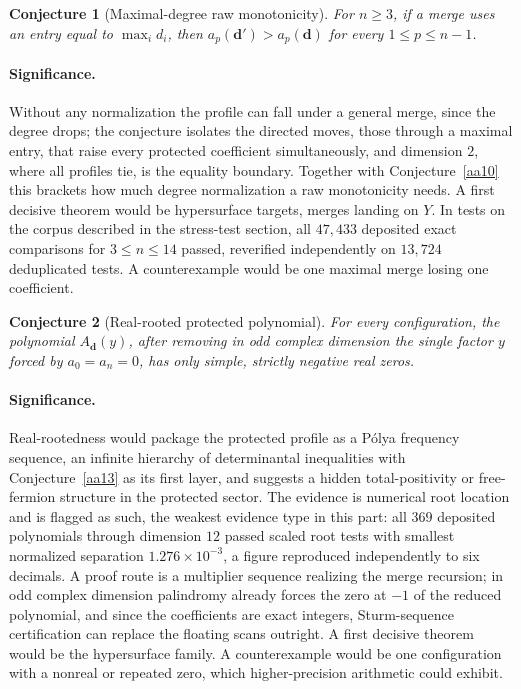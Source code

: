 \documentclass[11pt]{article}
\newtheorem{conjecture}{Conjecture}
\theoremstyle{definition}
\begin{document}
\begin{conjecture}[Maximal-degree raw monotonicity]\label{aa11}
For $n\ge3$, if a merge uses an entry equal to $\max_id_i$, then $a_p(\mathbf d')>a_p(\mathbf d)$ for every $1\le p\le n-1$.
\end{conjecture}

\paragraph{Significance.}
Without any normalization the profile can fall under a general merge, since the degree drops; the conjecture isolates the directed moves, those through a maximal entry, that raise every protected coefficient simultaneously, and dimension $2$, where all profiles tie, is the equality boundary.  Together with Conjecture~\ref{aa10} this brackets how much degree normalization a raw monotonicity needs.  A first decisive theorem would be hypersurface targets, merges landing on $Y$.  In tests on the corpus described in the stress-test section, all $47{,}433$ deposited exact comparisons for $3\le n\le14$ passed, reverified independently on $13{,}724$ deduplicated tests.  A counterexample would be one maximal merge losing one coefficient.

\begin{conjecture}[Real-rooted protected polynomial]\label{aa12}
For every configuration, the polynomial $A_{\mathbf d}(y)$, after removing in odd complex dimension the single factor $y$ forced by $a_0=a_n=0$, has only simple, strictly negative real zeros.
\end{conjecture}

\paragraph{Significance.}
Real-rootedness would package the protected profile as a P\'olya frequency sequence, an infinite hierarchy of determinantal inequalities with Conjecture~\ref{aa13} as its first layer, and suggests a hidden total-positivity or free-fermion structure in the protected sector.  The evidence is numerical root location and is flagged as such, the weakest evidence type in this part: all $369$ deposited polynomials through dimension $12$ passed scaled root tests with smallest normalized separation $1.276\times10^{-3}$, a figure reproduced independently to six decimals.  A proof route is a multiplier sequence realizing the merge recursion; in odd complex dimension palindromy already forces the zero at $-1$ of the reduced polynomial, and since the coefficients are exact integers, Sturm-sequence certification can replace the floating scans outright.  A first decisive theorem would be the hypersurface family.  A counterexample would be one configuration with a nonreal or repeated zero, which higher-precision arithmetic could exhibit.
\end{document}
